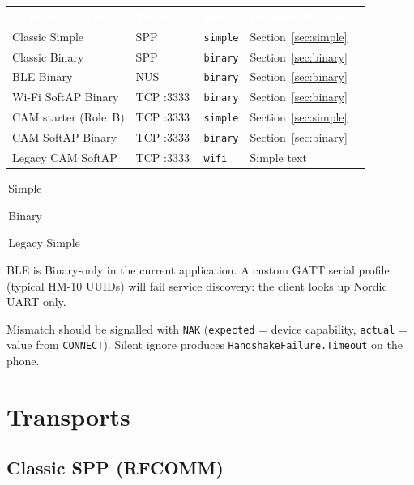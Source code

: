 \documentclass[12pt,a4paper]{article}
\newcommand{\thc}[1]{\textcolor{white}{\bfseries #1}}
\newcommand{\chip}[2]{\colorbox{#1}{\strut\,\scriptsize #2\,}}
\begin{document}
\begin{center}
\renewcommand{\arraystretch}{1.25}
\begin{tabular}{>{\raggedright\arraybackslash}p{3.5cm}
                >{\centering\arraybackslash}p{2.3cm}
                >{\centering\arraybackslash}p{1.8cm}
                >{\raggedright\arraybackslash}p{3.8cm}}
\rowcolor{TblHead}
\thc{Application mode} & \thc{Transport} & \thc{proto} & \thc{Payload after ACK} \\
\rowcolor{TblChan}
Classic Simple & SPP & \texttt{simple} & Section~\ref{sec:simple} \\
\rowcolor{TblTelem}
Classic Binary & SPP & \texttt{binary} & Section~\ref{sec:binary} \\
\rowcolor{TblTelem}
BLE Binary & NUS & \texttt{binary} & Section~\ref{sec:binary} \\
\rowcolor{TblTelem}
Wi-Fi SoftAP Binary & TCP :3333 & \texttt{binary} & Section~\ref{sec:binary} \\
\rowcolor{TblChan}
CAM starter (Role~B) & TCP :3333 & \texttt{simple} & Section~\ref{sec:simple} \\
\rowcolor{TblTelem}
CAM SoftAP Binary & TCP :3333 & \texttt{binary} & Section~\ref{sec:binary} \\
\rowcolor{TblId}
Legacy CAM SoftAP & TCP :3333 & \texttt{wifi} & Simple text \\
\end{tabular}

\vspace{0.4em}
\chip{TblChan}{Simple}
\chip{TblTelem}{Binary}
\chip{TblId}{Legacy Simple}
\end{center}

BLE is Binary-only in the current application.
A custom GATT serial profile (typical HM-10 UUIDs) will fail service
discovery: the client looks up Nordic UART only.

Mismatch should be signalled with \texttt{NAK} (\texttt{expected} = device
capability, \texttt{actual} = value from \texttt{CONNECT}).
Silent ignore produces \texttt{HandshakeFailure.Timeout} on the phone.

\section{Transports}
\label{sec:pipes}

\subsection{Classic SPP (RFCOMM)}
\end{document}
